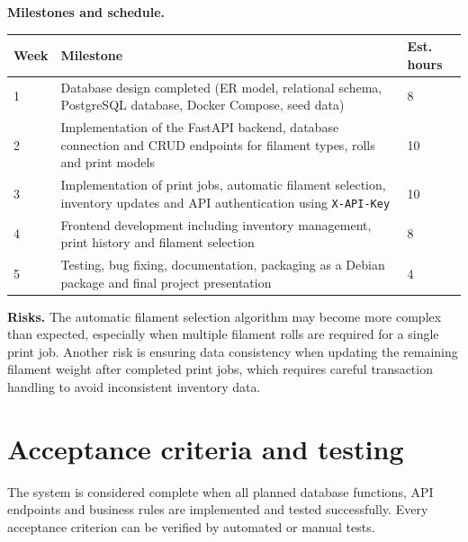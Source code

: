 \documentclass[11pt,a4paper]{article}
\begin{document}
\textbf{Milestones and schedule.}

\renewcommand{\arraystretch}{1.2}
\begin{tabularx}{\linewidth}{@{}p{1.4cm}Xp{1.8cm}@{}}
\toprule
\textbf{Week} & \textbf{Milestone} & \textbf{Est. hours} \\
\midrule
1 &
Database design completed (ER model, relational schema, PostgreSQL database,
Docker Compose, seed data) &
8 \\

2 &
Implementation of the FastAPI backend, database connection and CRUD endpoints
for filament types, rolls and print models &
10 \\

3 &
Implementation of print jobs, automatic filament selection, inventory updates
and API authentication using \texttt{X-API-Key} &
10 \\

4 &
Frontend development including inventory management, print history and filament
selection &
8 \\

5 &
Testing, bug fixing, documentation, packaging as a Debian package and final
project presentation &
4 \\

\bottomrule
\end{tabularx}

\textbf{Risks.}
The automatic filament selection algorithm may become more complex than
expected, especially when multiple filament rolls are required for a single
print job. Another risk is ensuring data consistency when updating the remaining
filament weight after completed print jobs, which requires careful transaction
handling to avoid inconsistent inventory data.

\section{Acceptance criteria and testing}

The system is considered complete when all planned database functions, API
endpoints and business rules are implemented and tested successfully. Every
acceptance criterion can be verified by automated or manual tests.
\end{document}
